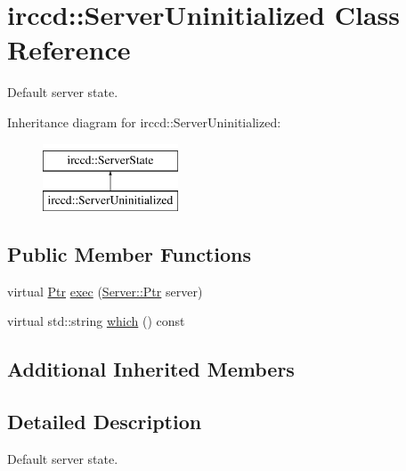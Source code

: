 \hypertarget{a00061}{\section{irccd\-:\-:Server\-Uninitialized Class Reference}
\label{a00061}
}


Default server state.  


Inheritance diagram for irccd\-:\-:Server\-Uninitialized\-:\begin{figure}[H]
\begin{center}
\leavevmode
\includegraphics[height=2.000000cm]{a00061}
\end{center}
\end{figure}
\subsection*{Public Member Functions}
\begin{DoxyCompactItemize}
\item 
virtual \hyperlink{a00060_aa1d1595a1abc377d310f06145103d7d3}{Ptr} \hyperlink{a00061_a42ee4a734b189fa5792a4098ff72e1a2}{exec} (\hyperlink{a00055_aea3f9694df81348b909814ac6f84f874}{Server\-::\-Ptr} server)
\begin{DoxyCompactList}\small\item\em \end{DoxyCompactList}\item 
virtual std\-::string \hyperlink{a00061_ace769cdb916e8e9fe178919c67994a94}{which} () const 
\begin{DoxyCompactList}\small\item\em \end{DoxyCompactList}\end{DoxyCompactItemize}
\subsection*{Additional Inherited Members}


\subsection{Detailed Description}
Default server state. 

